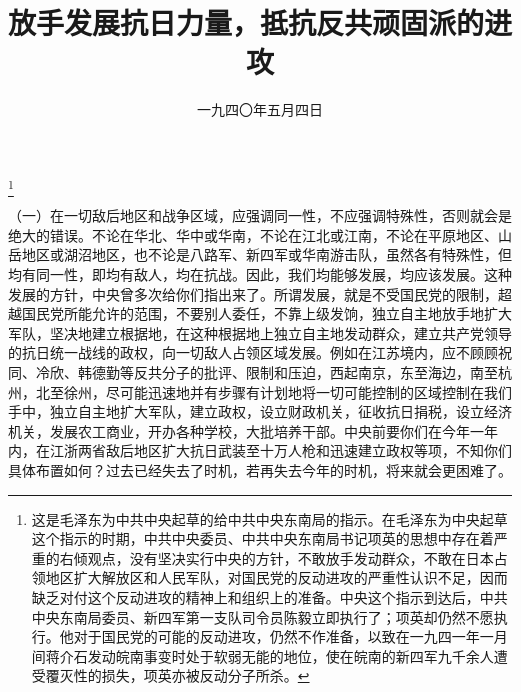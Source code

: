 
\title{放手发展抗日力量，抵抗反共顽固派的进攻}
\date{一九四〇年五月四日}
\thanks{这是毛泽东为中共中央起草的给中共中央东南局的指示。在毛泽东为中央起草这个指示的时期，中共中央委员、中共中央东南局书记项英的思想中存在着严重的右倾观点，没有坚决实行中央的方针，不敢放手发动群众，不敢在日本占领地区扩大解放区和人民军队，对国民党的反动进攻的严重性认识不足，因而缺乏对付这个反动进攻的精神上和组织上的准备。中央这个指示到达后，中共中央东南局委员、新四军第一支队司令员陈毅立即执行了；项英却仍然不愿执行。他对于国民党的可能的反动进攻，仍然不作准备，以致在一九四一年一月间蒋介石发动皖南事变时处于软弱无能的地位，使在皖南的新四军九千余人遭受覆灭性的损失，项英亦被反动分子所杀。}
\maketitle


（一）在一切敌后地区和战争区域，应强调同一性，不应强调特殊性，否则就会是绝大的错误。不论在华北、华中或华南，不论在江北或江南，不论在平原地区、山岳地区或湖沼地区，也不论是八路军、新四军或华南游击队，虽然各有特殊性，但均有同一性，即均有敌人，均在抗战。因此，我们均能够发展，均应该发展。这种发展的方针，中央曾多次给你们指出来了。所谓发展，就是不受国民党的限制，超越国民党所能允许的范围，不要别人委任，不靠上级发饷，独立自主地放手地扩大军队，坚决地建立根据地，在这种根据地上独立自主地发动群众，建立共产党领导的抗日统一战线的政权，向一切敌人占领区域发展。例如在江苏境内，应不顾顾祝同、冷欣、韩德勤等反共分子的批评、限制和压迫，西起南京，东至海边，南至杭州，北至徐州，尽可能迅速地并有步骤有计划地将一切可能控制的区域控制在我们手中，独立自主地扩大军队，建立政权，设立财政机关，征收抗日捐税，设立经济机关，发展农工商业，开办各种学校，大批培养干部。中央前要你们在今年一年内，在江浙两省敌后地区扩大抗日武装至十万人枪和迅速建立政权等项，不知你们具体布置如何？过去已经失去了时机，若再失去今年的时机，将来就会更困难了。

